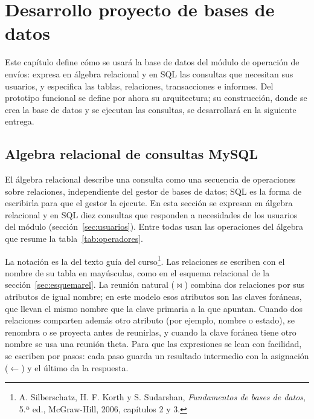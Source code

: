 
\section{Desarrollo proyecto de bases de datos}

Este capítulo define cómo se usará la base de datos del módulo de
operación de envíos: expresa en álgebra relacional y en SQL las
consultas que necesitan sus usuarios, y especifica las tablas,
relaciones, transacciones e informes. Del prototipo funcional se define
por ahora su arquitectura; su construcción, donde se crea la base de
datos y se ejecutan las consultas, se desarrollará en la siguiente
entrega.

\subsection{Algebra relacional de consultas MySQL}
\label{sec:algebra}

El álgebra relacional describe una consulta como una secuencia de
operaciones sobre relaciones, independiente del gestor de bases de
datos; SQL es la forma de escribirla para que el gestor la ejecute. En
esta sección se expresan en álgebra relacional y en SQL diez consultas
que responden a necesidades de los usuarios del módulo
(sección~\ref{sec:usuarios}). Entre todas usan las operaciones del
álgebra que resume la tabla~\ref{tab:operadores}.

La notación es la del texto guía del curso\footnote{A. Silberschatz,
H. F. Korth y S. Sudarshan, \textit{Fundamentos de bases de datos},
5.ª ed., McGraw-Hill, 2006, capítulos 2 y 3.}. Las relaciones se
escriben con el nombre de su tabla en mayúsculas, como en el esquema
relacional de la sección~\ref{sec:esquemarel}. La reunión natural
($\bowtie$) combina dos relaciones por sus atributos de igual nombre;
en este modelo esos atributos son las claves foráneas, que llevan el
mismo nombre que la clave primaria a la que apuntan. Cuando dos
relaciones comparten además otro atributo (por ejemplo, nombre o
estado), se renombra o se proyecta antes de reunirlas, y cuando la
clave foránea tiene otro nombre se usa una reunión theta. Para que las
expresiones se lean con facilidad, se escriben por pasos: cada paso
guarda un resultado intermedio con la asignación ($\leftarrow$) y el
último da la respuesta.

